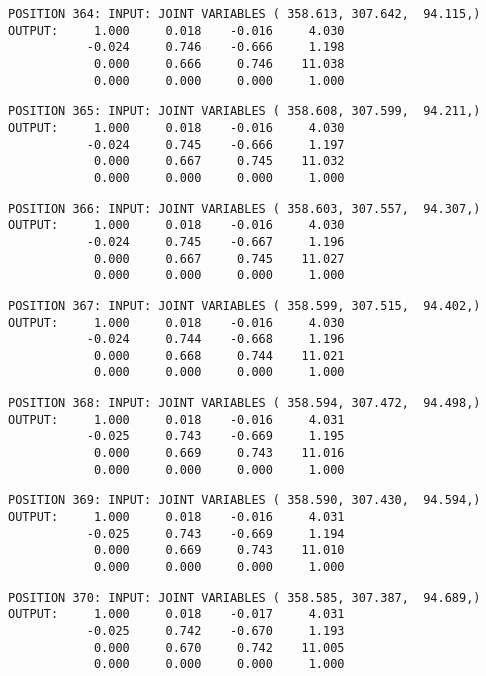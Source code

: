 \begin{verbatim}
POSITION 364: INPUT: JOINT VARIABLES ( 358.613, 307.642,  94.115,)
OUTPUT:     1.000     0.018    -0.016     4.030
           -0.024     0.746    -0.666     1.198
            0.000     0.666     0.746    11.038
            0.000     0.000     0.000     1.000
\end{verbatim} \pagebreak[1]\begin{verbatim}
POSITION 365: INPUT: JOINT VARIABLES ( 358.608, 307.599,  94.211,)
OUTPUT:     1.000     0.018    -0.016     4.030
           -0.024     0.745    -0.666     1.197
            0.000     0.667     0.745    11.032
            0.000     0.000     0.000     1.000
\end{verbatim} \pagebreak[1]\begin{verbatim}
POSITION 366: INPUT: JOINT VARIABLES ( 358.603, 307.557,  94.307,)
OUTPUT:     1.000     0.018    -0.016     4.030
           -0.024     0.745    -0.667     1.196
            0.000     0.667     0.745    11.027
            0.000     0.000     0.000     1.000
\end{verbatim} \pagebreak[1]\begin{verbatim}
POSITION 367: INPUT: JOINT VARIABLES ( 358.599, 307.515,  94.402,)
OUTPUT:     1.000     0.018    -0.016     4.030
           -0.024     0.744    -0.668     1.196
            0.000     0.668     0.744    11.021
            0.000     0.000     0.000     1.000
\end{verbatim} \pagebreak[1]\begin{verbatim}
POSITION 368: INPUT: JOINT VARIABLES ( 358.594, 307.472,  94.498,)
OUTPUT:     1.000     0.018    -0.016     4.031
           -0.025     0.743    -0.669     1.195
            0.000     0.669     0.743    11.016
            0.000     0.000     0.000     1.000
\end{verbatim} \pagebreak[1]\begin{verbatim}
POSITION 369: INPUT: JOINT VARIABLES ( 358.590, 307.430,  94.594,)
OUTPUT:     1.000     0.018    -0.016     4.031
           -0.025     0.743    -0.669     1.194
            0.000     0.669     0.743    11.010
            0.000     0.000     0.000     1.000
\end{verbatim} \pagebreak[1]\begin{verbatim}
POSITION 370: INPUT: JOINT VARIABLES ( 358.585, 307.387,  94.689,)
OUTPUT:     1.000     0.018    -0.017     4.031
           -0.025     0.742    -0.670     1.193
            0.000     0.670     0.742    11.005
            0.000     0.000     0.000     1.000
\end{verbatim} \pagebreak[1]\begin{verbatim}

\end{verbatim}
